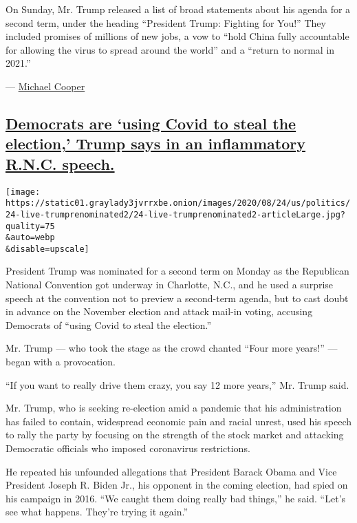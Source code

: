 On Sunday, Mr. Trump released a list of broad statements about his
agenda for a second term, under the heading ``President Trump: Fighting
for You!'' They included promises of millions of new jobs, a vow to
``hold China fully accountable for allowing the virus to spread around
the world'' and a ``return to normal in 2021.''

--- \href{https://www.nytimes3xbfgragh.onion/by/michael-cooper}{Michael
Cooper}

\hypertarget{democrats-are-using-covid-to-steal-the-election-trump-says-in-an-inflammatory-rnc-speech}{%
\subsection{\texorpdfstring{\protect\hyperlink{democrats-are-using-covid-to-steal-the-election-trump-says-in-an-inflammatory-rnc-speech}{Democrats
are `using Covid to steal the election,' Trump says in an inflammatory
R.N.C.
speech.}}{Democrats are `using Covid to steal the election,' Trump says in an inflammatory R.N.C. speech.}}\label{democrats-are-using-covid-to-steal-the-election-trump-says-in-an-inflammatory-rnc-speech}}

\texttt{[image: https://static01.graylady3jvrrxbe.onion/images/2020/08/24/us/politics/24-live-trumprenominated2/24-live-trumprenominated2-articleLarge.jpg?quality=75\\\&auto=webp\\\&disable=upscale]}

President Trump was nominated for a second term on Monday as the
Republican National Convention got underway in Charlotte, N.C., and he
used a surprise speech at the convention not to preview a second-term
agenda, but to cast doubt in advance on the November election and attack
mail-in voting, accusing Democrats of ``using Covid to steal the
election.''

Mr. Trump --- who took the stage as the crowd chanted ``Four more
years!'' --- began with a provocation.

``If you want to really drive them crazy, you say 12 more years,'' Mr.
Trump said.

Mr. Trump, who is seeking re-election amid a pandemic that his
administration has failed to contain, widespread economic pain and
racial unrest, used his speech to rally the party by focusing on the
strength of the stock market and attacking Democratic officials who
imposed coronavirus restrictions.

He repeated his unfounded allegations that President Barack Obama and
Vice President Joseph R. Biden Jr., his opponent in the coming election,
had spied on his campaign in 2016. ``We caught them doing really bad
things,'' he said. ``Let's see what happens. They're trying it again.''

